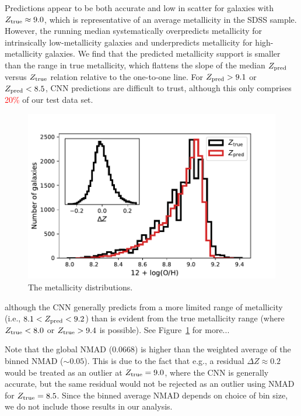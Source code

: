 \documentclass[fleqn,usenatbib]{mnras}
\newcommand{\editorial}[1]{\textcolor{red}{#1}}
\begin{document}
Predictions appear to be both accurate and low in scatter for galaxies with $Z_{\rm true} \approx 9.0$, which is representative of an average metallicity in the SDSS sample.
However, the running median systematically overpredicts metallicity for intrinsically low-metallicity galaxies and underpredicts metallicity for high-metallicity galaxies.
We find that the predicted metallicity support is smaller than the range in true metallicity, which flattens the slope of the median $Z_{\rm pred}$ versus $Z_{\rm true}$ relation relative to the one-to-one line.
For $Z_{\rm pred} > 9.1$ or $Z_{\rm pred} < 8.5$, CNN predictions are difficult to trust, although this only comprises \editorial{20\%} of our test data set.



\begin{figure}
	\includegraphics[width=\columnwidth]{03-Z_distribution.pdf}
	\caption{\label{fig:distributions}
		The metallicity distributions.}
\end{figure}

although the CNN generally predicts from a more limited range of metallicity (i.e., $8.1 < Z_{\rm pred} < 9.2$) than is evident from the true metallicity range (where $Z_{\rm true} < 8.0$ or $Z_{\rm true} > 9.4$ is possible).
See Figure~\ref{fig:distributions} for more...


Note that the global NMAD (0.0668) is higher than the weighted average of the binned NMAD ($\sim 0.05$).
This is due to the fact that e.g., a residual $\Delta Z \approx 0.2$ would be treated as an outlier at $Z_{\rm true} = 9.0$, where the CNN is generally accurate, but the same residual would not be rejected as an outlier using NMAD for $Z_{\rm true} = 8.5$.
Since the binned average NMAD depends on choice of bin size, we do not include those results in our analysis.
\end{document}
